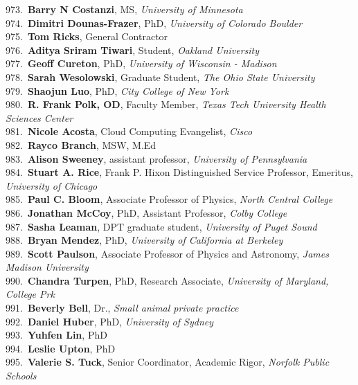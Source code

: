 973.~{\bf Barry N Costanzi}, MS, {\sl University of Minnesota} \\
974.~{\bf Dimitri Dounas-Frazer}, PhD, {\sl University of Colorado Boulder} \\
975.~{\bf Tom Ricks}, General Contractor \\
976.~{\bf Aditya Sriram Tiwari}, Student, {\sl Oakland University} \\
977.~{\bf Geoff Cureton}, PhD, {\sl University of Wisconsin - Madison} \\
978.~{\bf Sarah Wesolowski}, Graduate Student, {\sl The Ohio State University} \\
979.~{\bf Shaojun Luo}, PhD, {\sl City College of New York} \\
980.~{\bf R. Frank Polk, OD}, Faculty Member, {\sl Texas Tech University Health Sciences Center} \\
981.~{\bf Nicole Acosta}, Cloud Computing Evangelist, {\sl Cisco} \\
982.~{\bf Rayco Branch}, MSW, M.Ed \\
983.~{\bf Alison Sweeney}, assistant professor, {\sl University of Pennsylvania} \\
984.~{\bf Stuart A. Rice}, Frank P. Hixon Distinguished Service Professor, Emeritus, {\sl University of Chicago} \\
985.~{\bf Paul C. Bloom}, Associate Professor of Physics, {\sl North Central College} \\
986.~{\bf Jonathan McCoy}, PhD, Assistant Professor, {\sl Colby College} \\
987.~{\bf Sasha Leaman}, DPT graduate student, {\sl University of Puget Sound} \\
988.~{\bf Bryan Mendez}, PhD, {\sl University of California at Berkeley } \\
989.~{\bf Scott Paulson}, Associate Professor of Physics and Astronomy, {\sl James Madison University} \\
990.~{\bf Chandra Turpen}, PhD, Research Associate, {\sl University of Maryland, College Prk} \\
991.~{\bf Beverly Bell}, Dr., {\sl Small animal private practice} \\
992.~{\bf Daniel Huber}, PhD, {\sl University of Sydney} \\
993.~{\bf Yuhfen Lin}, PhD \\
994.~{\bf Leslie Upton}, PhD \\
995.~{\bf Valerie S. Tuck}, Senior Coordinator, Academic Rigor, {\sl Norfolk Public Schools} \\
